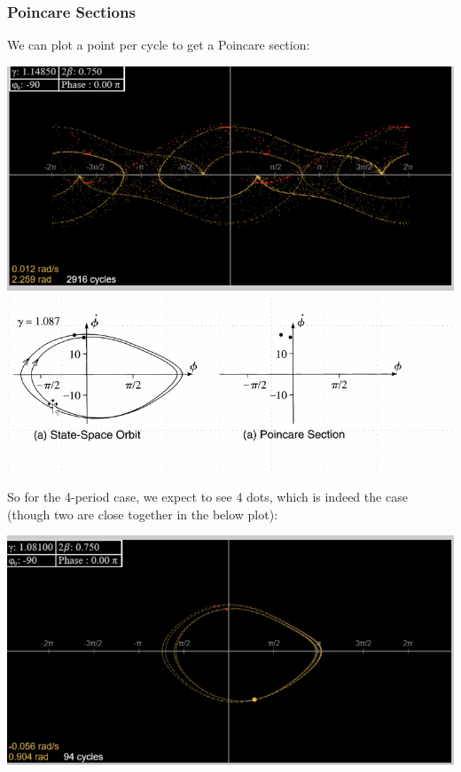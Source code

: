 \documentclass[../PHYS306Notes.tex]{subfiles}
\begin{document}
\subsubsection{Poincare Sections}
We can plot a point per cycle to get a Poincare section:
\begin{center}
    \includegraphics[scale=0.7]{Lecture-33/l33-img16.png}
    \includegraphics[scale=0.7]{Lecture-33/l33-img17.png}
\end{center}
So for the 4-period case, we expect to see 4 dots, which is indeed the case (though two are close together in the below plot):
\begin{center}
    \includegraphics[scale=0.7]{Lecture-33/l33-img18.png}
\end{center}
\end{document}
